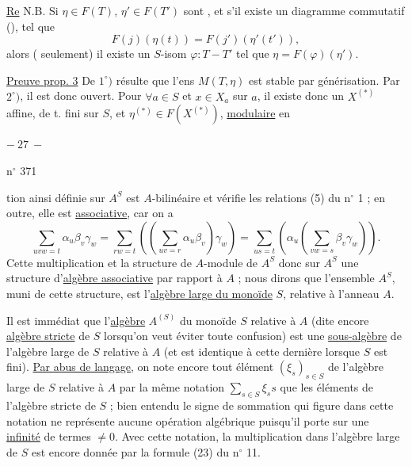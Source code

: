 \uline{Re} N.B. Si $\eta\in F(T)$, $\eta'\in F(T')$ sont  , et s'il existe un diagramme commutatif (), tel que
\[
F(j)(\eta(t))=F(j')(\eta'(t')),
\]
alors ( seulement) il existe un $S$-isom $\varphi:T\mathbin{-}T'$ tel que $\eta=F(\varphi)(\eta')$.


\uline{Preuve prop. 3}  De $1^\circ)$ résulte que l'ens  $M(T,\eta)$ est stable par  générisation. Par $2^\circ)$, il est donc ouvert.   Pour $\forall a\in S$ et $x\in X_a$ sur $a$,  il existe donc un  $X^{(*)}$  affine,  de t. fini sur $S$, et $\eta^{(*)}\in F(X^{(*)})$, \uline{modulaire}  en
\begin{center}$-\ 27\ -$\end{center}
\hfill n$^\circ$ 371

tion ainsi définie sur $A^S$ est $A$-bilinéaire et vérifie les relations (5) du n$^\circ$ 1 ; en outre, elle est \uline{associative}, car on a
\[
\sum_{uvw=t}\alpha_u\beta_v\gamma_w=\sum_{rw=t}\left(\left(\sum_{uv=r}\alpha_u\beta_v\right)\gamma_w\right)=\sum_{us=t}\left(\alpha_u\left(\sum_{vw=s}\beta_v\gamma_w\right)\right).
\]
Cette multiplication et la structure de $A$-module de $A^S$  donc sur $A^S$ une structure d'\uline{algèbre associative} par rapport à $A$ ; nous dirons que l'ensemble $A^S$, muni de cette structure, est l'\uline{algèbre large du monoïde} $S$, relative à l'anneau $A$.

Il est immédiat que l'\uline{algèbre} $A^{(S)}$ du monoïde $S$ relative à $A$ (dite encore \uline{algèbre stricte} de $S$ lorsqu'on veut éviter toute confusion) est une \uline{sous-algèbre} de l'algèbre large de $S$ relative à $A$ (et est identique à cette dernière lorsque $S$ est fini). \uline{Par abus de langage}, on note encore tout élément $(\xi_s)_{s\in S}$ de l'algèbre large de $S$ relative à $A$ par la même notation $\sum_{s\in S}\xi_s s$ que les éléments de l'algèbre stricte de $S$ ; bien entendu le signe de sommation qui figure dans cette notation ne représente aucune opération algébrique puisqu'il porte sur une \uline{infinité} de termes $\ne0$. Avec cette notation, la multiplication dans l'algèbre large de $S$ est encore donnée par la formule (23) du n$^\circ$ 11.

